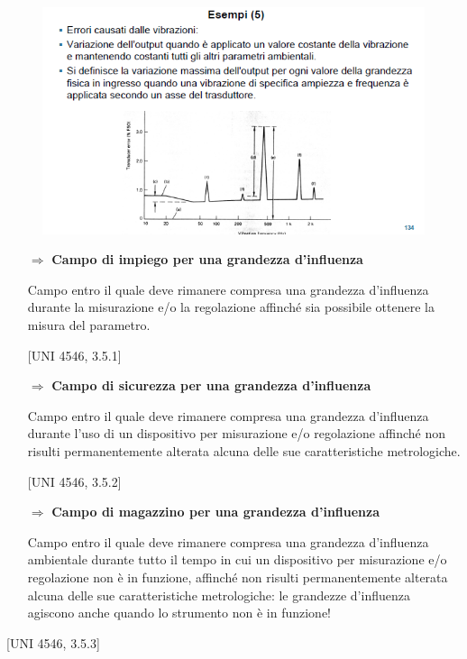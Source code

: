 \documentclass[a4paper, 15pt]{article}
\begin{document}
\begin{adjustwidth}{2in}{}
\begin{figure}[H]
	\label{fig:screenshot039}
\end{figure}
\begin{figure}[H]
	\centering
	\includegraphics[width=0.7\linewidth]{fig/screenshot040}
	\label{fig:screenshot040}
\end{figure}

\begin{itemize}	
\item[$\Rightarrow$] \textbf{Campo di impiego per una grandezza d'influenza} 
 
		Campo entro il quale deve rimanere compresa una grandezza d'influenza
		durante la misurazione e/o la regolazione affinché sia possibile ottenere la
		misura del parametro.
		
		[UNI 4546, 3.5.1] 
		
\item[$\Rightarrow$] \textbf{Campo di sicurezza per una grandezza d'influenza} 
 
		Campo entro il quale deve rimanere compresa una grandezza d'influenza
		durante l'uso di un dispositivo per misurazione e/o regolazione affinché non
		risulti permanentemente alterata alcuna delle sue caratteristiche metrologiche.
		
		[UNI 4546, 3.5.2]
		
\item[$\Rightarrow$] \textbf{Campo di magazzino per una grandezza d'influenza} 


		Campo entro il quale deve rimanere compresa una grandezza d'influenza
		ambientale durante tutto il tempo in cui un dispositivo per misurazione e/o
		regolazione non è in funzione, affinché non risulti permanentemente alterata
		alcuna delle sue caratteristiche metrologiche: le grandezze d'influenza agiscono anche quando lo strumento non è in funzione! 		
\end{itemize}
		[UNI 4546, 3.5.3] \newline 
\end{adjustwidth}
\end{document}
